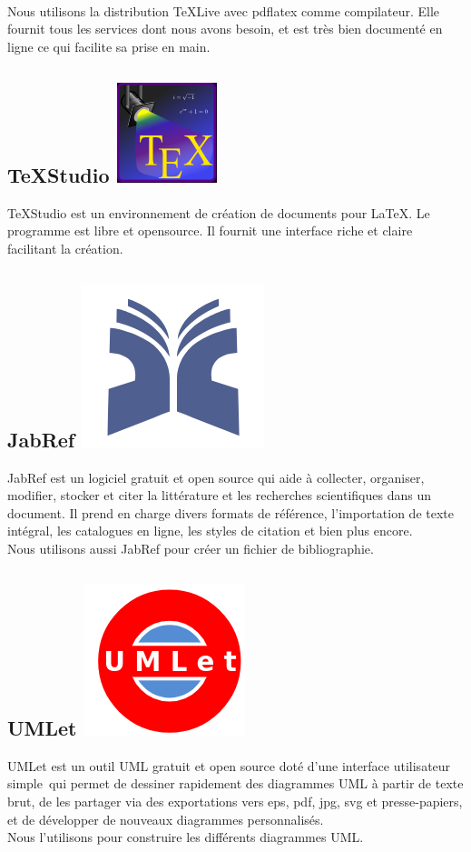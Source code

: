 			\paragraph{}Nous utilisons la distribution \TeX Live avec pdflatex comme compilateur. Elle fournit tous les services dont nous avons besoin, et est tr\`es bien document\'e en ligne ce qui facilite sa prise en main.
				
				
		\subsection{\TeX Studio \includegraphics[height=2ex]{Pictures/texstudioLogo.png}}
			\TeX Studio est un environnement de cr\'eation de documents pour \LaTeX . Le programme est libre et opensource. Il fournit une interface riche et claire facilitant la cr\'eation.\cite{TexStudio}
				
		\subsection{JabRef \includegraphics[height=2ex]{Pictures/jabrefLogo.png}}
			JabRef est un logiciel gratuit et open source qui aide \`a collecter, organiser, modifier, stocker et citer la litt\'erature et les recherches scientifiques dans un document. Il prend en charge divers formats de r\'ef\'erence, l'importation de texte int\'egral, les catalogues en ligne, les styles de citation et bien plus encore.\cite{jabref}\\
			Nous utilisons aussi JabRef pour cr\'eer un fichier de bibliographie.
	
		\subsection{UMLet \includegraphics[height=2ex]{Pictures/umletLogo.png}}
			UMLet est un outil UML gratuit et open source dot\'e d'une interface utilisateur simple qui permet de dessiner rapidement des diagrammes UML \`a partir de texte brut, de les partager via des exportations vers eps, pdf, jpg, svg et presse-papiers, et de d\'evelopper de nouveaux diagrammes personnalis\'es. \cite{umlet}\\
			Nous l'utilisons pour construire les diff\'erents diagrammes UML.
			
